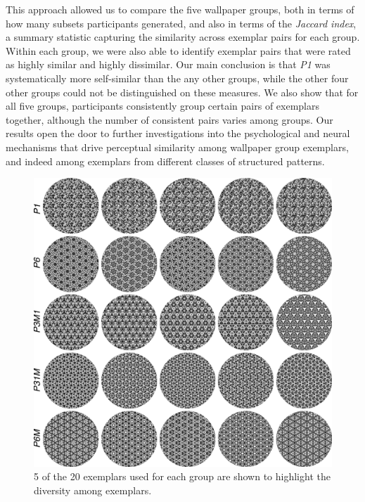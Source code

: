 \documentclass[11pt, twoside]{article}
\begin{document}
This approach allowed us to compare the five wallpaper groups, both in terms of how many subsets participants generated, and also in terms of the \textit{Jaccard index}, a summary statistic capturing the similarity across exemplar pairs for each group. Within each group, we were also able to identify exemplar pairs that were rated as highly similar and highly dissimilar. Our main conclusion is that \textit{P1} was systematically more self-similar than the any other groups, while the other four other groups could not be distinguished on these measures. We also show that for all five groups, participants consistently group certain pairs of exemplars together, although the number of consistent pairs varies among groups. Our results open the door to further investigations into the psychological and neural mechanisms that drive perceptual similarity among wallpaper group exemplars, and indeed among exemplars from different classes of structured patterns. 

\begin{figure}[H]
	\centering
	\includegraphics[width=\linewidth]{./figures//wpg_exemplars.pdf}
	\caption{5 of the 20 exemplars used for each group are shown to highlight the diversity among exemplars.}
	\label{fig:wpg_exemplars}
\end{figure}
\end{document}
